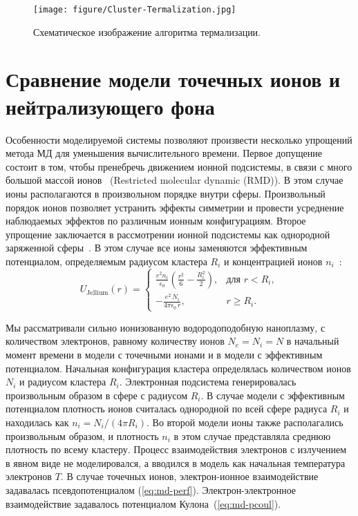 \begin{figure}[htb] %
	\centering
	
	\texttt{[image: figure/Cluster-Termalization.jpg]}
	\caption{\label{fig:cluster-Termalization}Схематическое изображение алгоритма термализации.}
\end{figure}


\section{Сравнение модели точечных ионов и нейтрализующего фона}

Особенности моделируемой системы позволяют произвести несколько упрощений метода МД для уменьшения вычислительного времени. Первое допущение состоит в том, чтобы пренебречь движением ионной подсистемы, в связи с много большой массой ионов~\cite{RRRM-IJMPB08,Winkel-CPP13} (Restricted molecular dynamic (RMD)). В этом случае ионы располагаются в произвольном порядке внутри сферы. Произвольный порядок ионов позволяет устранить эффекты симметрии и провести усреднение наблюдаемых эффектов по различным ионным конфигурациям. Второе упрощение заключается в рассмотрении ионной подсистемы как однородной заряженной сферы~\cite{Broda_CPP13}. 
В этом случае все ионы заменяются эффективным потенциалом, определяемым радиусом кластера $R_i$ и концентрацией ионов $n_i$~\cite{Broda_CPP13}:
\begin{equation}\label{eq:cluster-potjellium}
U_\mathrm{Jellium}(r)=
\begin{cases}
\frac{e^2 n_{i}}{\epsilon _0}\left(\frac{r^2}{6}-\frac{R_{i}^2}{2}\right), &\text{для } r<R_{i}, \\
- \frac{e^2\,N_\mathrm{i}}{4\pi\epsilon_0\,r}, &r \geqslant R_i .  
\end{cases}
\end{equation}

Мы рассматривали сильно ионизованную водородоподобную наноплазму, с количеством электронов, равному количеству ионов $N_e=N_i=N$ в начальный момент времени в модели с точечными ионами и в модели с эффективным потенциалом. Начальная конфигурация кластера определялась количеством ионов $N_i$ и радиусом кластера $R_i$. Электронная подсистема генерировалась произвольным образом в сфере с радиусом $R_i$. В случае модели с эффективным потенциалом плотность ионов считалась однородной по всей сфере радиуса $R_i$ и находилась как $n_i = N_i/(4 \pi R_i)$. Во второй модели ионы также располагались произвольным образом, и плотность $n_i$  в этом случае представляла среднюю плотность по всему кластеру. Процесс взаимодействия электронов с излучением в явном виде не моделировался, а вводился в модель как начальная температура электронов $T$. 
В случае точечных ионов, электрон-ионное взаимодействие задавалась псевдопотенциалом (\ref{eq:md-perf}). Электрон-электронное взаимодействие задавалось потенциалом Кулона~(\ref{eq:md-pcoul}).


